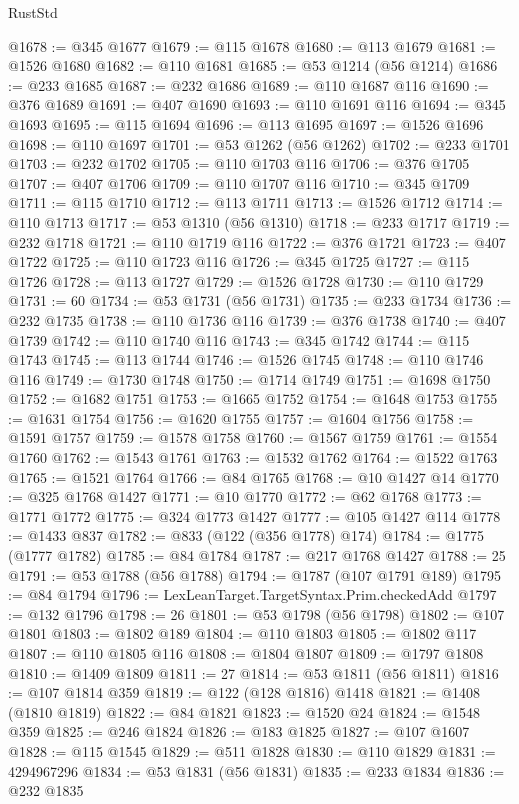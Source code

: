 \begin{lexlean}{RustStd}
\begin{coremodule}
@1678 := @345 @1677
@1679 := @115 @1678
@1680 := @113 @1679
@1681 := @1526 @1680
@1682 := @110 @1681
@1685 := @53 @1214 (@56 @1214)
@1686 := @233 @1685
@1687 := @232 @1686
@1689 := @110 @1687 @116
@1690 := @376 @1689
@1691 := @407 @1690
@1693 := @110 @1691 @116
@1694 := @345 @1693
@1695 := @115 @1694
@1696 := @113 @1695
@1697 := @1526 @1696
@1698 := @110 @1697
@1701 := @53 @1262 (@56 @1262)
@1702 := @233 @1701
@1703 := @232 @1702
@1705 := @110 @1703 @116
@1706 := @376 @1705
@1707 := @407 @1706
@1709 := @110 @1707 @116
@1710 := @345 @1709
@1711 := @115 @1710
@1712 := @113 @1711
@1713 := @1526 @1712
@1714 := @110 @1713
@1717 := @53 @1310 (@56 @1310)
@1718 := @233 @1717
@1719 := @232 @1718
@1721 := @110 @1719 @116
@1722 := @376 @1721
@1723 := @407 @1722
@1725 := @110 @1723 @116
@1726 := @345 @1725
@1727 := @115 @1726
@1728 := @113 @1727
@1729 := @1526 @1728
@1730 := @110 @1729
@1731 := 60
@1734 := @53 @1731 (@56 @1731)
@1735 := @233 @1734
@1736 := @232 @1735
@1738 := @110 @1736 @116
@1739 := @376 @1738
@1740 := @407 @1739
@1742 := @110 @1740 @116
@1743 := @345 @1742
@1744 := @115 @1743
@1745 := @113 @1744
@1746 := @1526 @1745
@1748 := @110 @1746 @116
@1749 := @1730 @1748
@1750 := @1714 @1749
@1751 := @1698 @1750
@1752 := @1682 @1751
@1753 := @1665 @1752
@1754 := @1648 @1753
@1755 := @1631 @1754
@1756 := @1620 @1755
@1757 := @1604 @1756
@1758 := @1591 @1757
@1759 := @1578 @1758
@1760 := @1567 @1759
@1761 := @1554 @1760
@1762 := @1543 @1761
@1763 := @1532 @1762
@1764 := @1522 @1763
@1765 := @1521 @1764
@1766 := @84 @1765
@1768 := @10 @1427 @14
@1770 := @325 @1768 @1427
@1771 := @10 @1770
@1772 := @62 @1768
@1773 := @1771 @1772
@1775 := @324 @1773 @1427
@1777 := @105 @1427 @114
@1778 := @1433 @837
@1782 := @833 (@122 (@356 @1778) @174)
@1784 := @1775 (@1777 @1782)
@1785 := @84 @1784
@1787 := @217 @1768 @1427
@1788 := 25
@1791 := @53 @1788 (@56 @1788)
@1794 := @1787 (@107 @1791 @189)
@1795 := @84 @1794
@1796 := LexLeanTarget.TargetSyntax.Prim.checkedAdd
@1797 := @132 @1796
@1798 := 26
@1801 := @53 @1798 (@56 @1798)
@1802 := @107 @1801
@1803 := @1802 @189
@1804 := @110 @1803
@1805 := @1802 @117
@1807 := @110 @1805 @116
@1808 := @1804 @1807
@1809 := @1797 @1808
@1810 := @1409 @1809
@1811 := 27
@1814 := @53 @1811 (@56 @1811)
@1816 := @107 @1814 @359
@1819 := @122 (@128 @1816) @1418
@1821 := @1408 (@1810 @1819)
@1822 := @84 @1821
@1823 := @1520 @24
@1824 := @1548 @359
@1825 := @246 @1824
@1826 := @183 @1825
@1827 := @107 @1607
@1828 := @115 @1545
@1829 := @511 @1828
@1830 := @110 @1829
@1831 := 4294967296
@1834 := @53 @1831 (@56 @1831)
@1835 := @233 @1834
@1836 := @232 @1835

\end{coremodule}
\end{lexlean}
